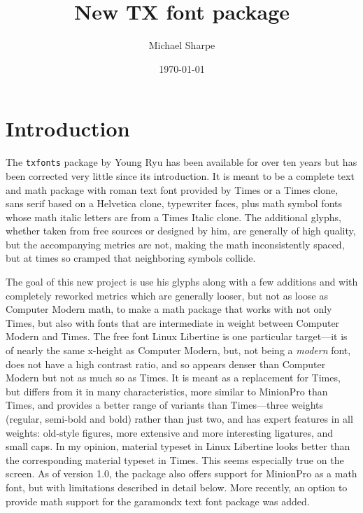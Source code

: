 \documentclass[11pt]{article}
\title{New TX font package}
\author{Michael Sharpe}
\date{\today}  %
\begin{document}
\maketitle
\section{Introduction}
The {\tt txfonts} package by Young Ryu has been available for over ten years but has been corrected very little since its introduction. It is meant to be a complete text and math package with roman text font provided by Times or a Times clone, sans serif based on a \textsf{Helvetica} clone, typewriter faces, plus math symbol fonts whose math italic letters are from a Times Italic clone. The additional glyphs, whether taken from free sources or designed by him, are generally of high quality, but the accompanying metrics are not, making the math inconsistently spaced, but at times so cramped that neighboring symbols  collide.

The goal of this new project is use his glyphs along with a few additions and with completely reworked metrics which are generally looser, but not as loose as Computer Modern math, to make a math package that works with not only Times, but also with fonts that are intermediate in weight between Computer Modern and Times. The free font Linux Libertine is one particular target---it is of nearly the same x-height as Computer Modern, but, not being a \emph{modern} font, does not have a high contrast ratio, and so appears  denser than Computer Modern but not as much so as Times. It is meant as a replacement for Times, but  differs from it in many characteristics, more similar to MinionPro than Times, and provides a better range of variants than Times---three weights (regular, semi-bold and bold) rather than just two, and has expert features in all weights: old-style figures, more extensive and more interesting ligatures,  and  small caps. In my opinion, material typeset in Linux Libertine looks better than the corresponding material typeset in Times. This seems especially true on the screen. As of version 1.0, the package also offers support for MinionPro as a math font, but with limitations described in detail below. More recently, an option to provide math support for the \textsf{garamondx} text font package was added.
\end{document}
